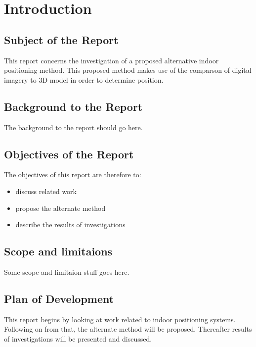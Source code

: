 \section{Introduction}
\subsection{Subject of the Report}
This report concerns the investigation of a proposed alternative indoor positioning method. This proposed method makes use of the comparson of digital imagery to 3D model in order to determine position.

\subsection{Background to the Report}
The background to the report should go here.


\subsection{Objectives of the Report}
The objectives of this report are therefore to:
\begin{itemize}
	\item discuss related work
	\item propose the alternate method
	\item describe the results of investigations
\end{itemize}

\subsection{Scope and limitaions}
Some scope and limitaion stuff goes here.

\subsection{Plan of Development}
This report begins by looking at work related to indoor positioning systems. Following on from that, the alternate method will be proposed. Thereafter results of investigations will be presented and discussed.
